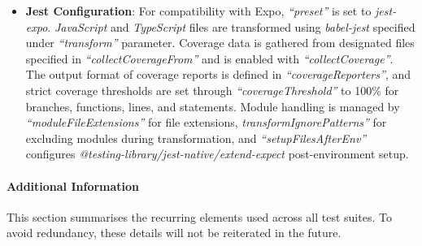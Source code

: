 \begin{itemize}
    \item \textbf{Jest Configuration}: For compatibility with Expo, \textit{``preset''} is set to \textit{jest-expo}. \textit{JavaScript} and \textit{TypeScript} files are transformed using \textit{babel-jest} specified under \textit{``transform''} parameter. Coverage data is gathered from designated files specified in \textit{``collectCoverageFrom''} and is enabled with \textit{``collectCoverage''}. The output format of coverage reports is defined in \textit{``coverageReporters''}, and strict coverage thresholds are set through \textit{``coverageThreshold''} to 100\% for branches, functions, lines, and statements. Module handling is managed by \textit{``moduleFileExtensions''} for file extensions, \textit{transformIgnorePatterns''} for excluding modules during transformation, and \textit{``setupFilesAfterEnv''} configures \textit{@testing-library/jest-native/extend-expect} post-environment setup.
\end{itemize}

\paragraph{Additional Information}

This section summarises the recurring elements used across all test suites. To avoid redundancy, these details will not be reiterated in the future.

